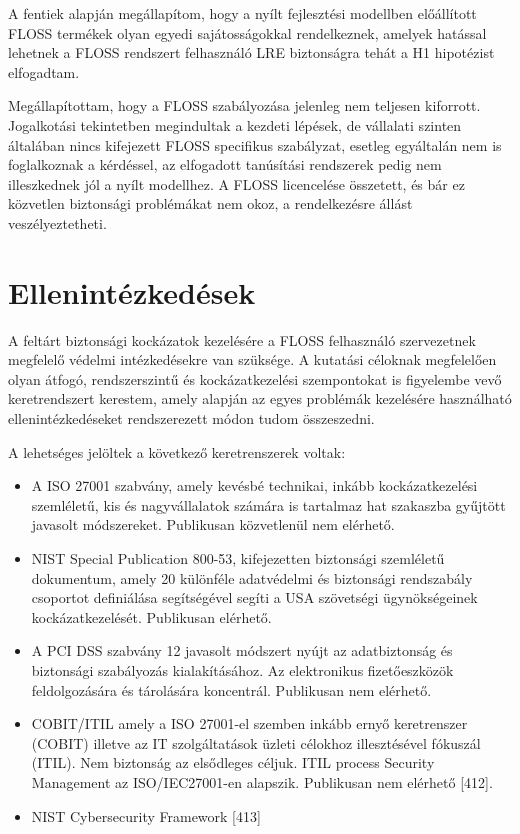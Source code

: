 \documentclass[12pt,magyar,a4paper,oneside]{scrreprt}
\providecommand{\tightlist}{%
  \setlength{\itemsep}{0pt}\setlength{\parskip}{0pt}}
\begin{document}
A fentiek alapján megállapítom, hogy a nyílt fejlesztési modellben
előállított FLOSS termékek olyan egyedi sajátosságokkal rendelkeznek,
amelyek hatással lehetnek a FLOSS rendszert felhasználó LRE biztonságra
tehát a H1 hipotézist elfogadtam.

Megállapítottam, hogy a FLOSS szabályozása jelenleg nem teljesen
kiforrott. Jogalkotási tekintetben megindultak a kezdeti lépések, de
vállalati szinten általában nincs kifejezett FLOSS specifikus
szabályzat, esetleg egyáltalán nem is foglalkoznak a kérdéssel, az
elfogadott tanúsítási rendszerek pedig nem illeszkednek jól a nyílt
modellhez. A FLOSS licencelése összetett, és bár ez közvetlen biztonsági
problémákat nem okoz, a rendelkezésre állást veszélyeztetheti.

\hypertarget{sec:ELLENINT}{%
\chapter{Ellenintézkedések}\label{sec:ELLENINT}}

A feltárt biztonsági kockázatok kezelésére a FLOSS felhasználó
szervezetnek megfelelő védelmi intézkedésekre van szüksége. A kutatási
céloknak megfelelően olyan átfogó, rendszerszintű és kockázatkezelési
szempontokat is figyelembe vevő keretrendszert kerestem, amely alapján
az egyes problémák kezelésére használható ellenintézkedéseket
rendszerezett módon tudom összeszedni.

A lehetséges jelöltek a következő keretrenszerek voltak:

\begin{itemize}
\tightlist
\item
  A ISO 27001 szabvány, amely kevésbé technikai, inkább kockázatkezelési
  szemléletű, kis és nagyvállalatok számára is tartalmaz hat szakaszba
  gyűjtött javasolt módszereket. Publikusan közvetlenül nem elérhető.
\item
  NIST Special Publication 800-53, kifejezetten biztonsági szemléletű
  dokumentum, amely 20 különféle adatvédelmi és biztonsági rendszabály
  csoportot definiálása segítségével segíti a USA szövetségi
  ügynökségeinek kockázatkezelését. Publikusan elérhető.
\item
  A PCI DSS szabvány 12 javasolt módszert nyújt az adatbiztonság és
  biztonsági szabályozás kialakításához. Az elektronikus fizetőeszközök
  feldolgozására és tárolására koncentrál. Publikusan nem elérhető.
\item
  COBIT/ITIL amely a ISO 27001-el szemben inkább ernyő keretrenszer
  (COBIT) illetve az IT szolgáltatások üzleti célokhoz illesztésével
  fókuszál (ITIL). Nem biztonság az elsődleges céljuk. ITIL process
  Security Management az ISO/IEC27001-en alapszik. Publikusan nem
  elérhető {[}412{]}.
\item
  NIST Cybersecurity Framework {[}413{]}
\end{itemize}
\end{document}
